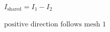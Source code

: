 \documentclass[border=12pt]{standalone}
\begin{document}
\color{weeknavy}
\parbox{11cm}{\centering $\displaystyle I_{\mathrm{shared}}=I_1-I_2$}
\vspace{4pt}
\parbox{11cm}{\centering $\displaystyle \text{positive direction follows mesh 1}$}
\end{document}
